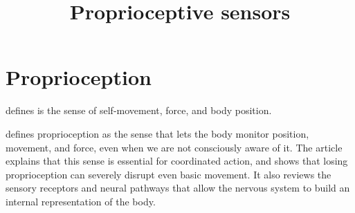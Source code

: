 \documentclass[a4paper]{article}
\title{Proprioceptive sensors}
\date{}
\begin{document}
    \maketitle
    
    
    \section{Proprioception}
        
         defines is the sense of self-movement, force, and body position.
        
        \cite{tuthill-2018-proprioception} defines proprioception as the sense that lets the body monitor position, movement, and force, even when we are not consciously aware of it.
        The article explains that this sense is essential for coordinated action, and shows that losing proprioception can severely disrupt even basic movement.
        It also reviews the sensory receptors and neural pathways that allow the nervous system to build an internal representation of the body.
        
        
\end{document}
